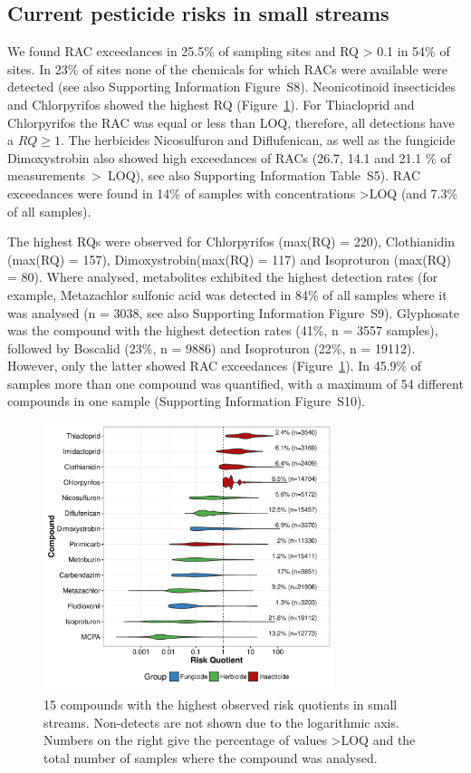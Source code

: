 \documentclass[journal=esthag,manuscript=article]{achemso}
\begin{document}
\subsection{Current pesticide risks in small streams}
We found RAC exceedances in 25.5\% of sampling sites and RQ > 0.1 in 54\% of sites. 
In 23\% of sites none of the chemicals for which RACs were available were detected (see also Supporting Information Figure~S8).
Neonicotinoid insecticides and Chlorpyrifos showed the highest RQ (Figure~\ref{fig:fig6}). %
For Thiacloprid and Chlorpyrifos the RAC was equal or less than LOQ, therefore, all detections have a $RQ \ge 1$. 
The herbicides Nicosulfuron and Diflufenican, as well as the fungicide Dimoxystrobin also showed high exceedances of RACs (26.7, 14.1 and 21.1 \% of measurements~\textgreater~LOQ), see also Supporting Information Table~S5).
RAC exceedances were found in 14\% of samples with concentrations \textgreater LOQ (and 7.3\% of all samples).

The highest RQs were observed for Chlorpyrifos (max(RQ) = 220), Clothianidin (max(RQ) = 157), Dimoxystrobin(max(RQ) = 117) and Isoproturon (max(RQ) = 80). 
Where analysed, metabolites exhibited the highest detection rates (for example, Metazachlor sulfonic acid was detected in 84\% of all samples where it was analysed (n = 3038, see also Supporting Information Figure~S9).
Glyphosate was the compound with the highest detection rates (41\%, n = 3557 samples), followed by Boscalid (23\%, n = 9886) and Isoproturon (22\%, n = 19112). 
However, only the latter showed RAC exceedances (Figure~\ref{fig:fig6}).
In 45.9\% of samples more than one compound was quantified, with a maximum of 54 different compounds in one sample (Supporting Information Figure~S10). 

\begin{figure}[ht]
  \includegraphics[width=3.33in]{figure6.pdf}
  \caption{15 compounds with the highest observed risk quotients in small streams. Non-detects are not shown due to the logarithmic axis. Numbers on the right give the percentage of values \textgreater LOQ and the total number of samples where the compound was analysed.
  }
  \label{fig:fig6}
\end{figure}
\end{document}
